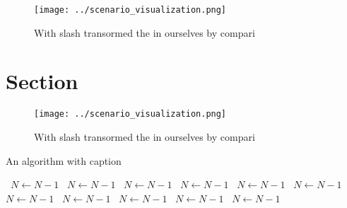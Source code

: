 \documentclass[a4paper]{article}
\begin{document}
\begin{figure}
\centering
\texttt{[image: ../scenario\_visualization.png]}
\caption{With slash transormed the in ourselves by compari
}
\end{figure}
 
\section{Section}

\begin{figure}
\centering
\texttt{[image: ../scenario\_visualization.png]}
\caption{With slash transormed the in ourselves by compari
}
\end{figure}
 
\begin{algorithm}
\caption{An algorithm with caption}
\begin{algorithmic}
\    \State $N \gets N - 1$
\    \State $N \gets N - 1$
\    \State $N \gets N - 1$
\    \State $N \gets N - 1$
\    \State $N \gets N - 1$
\    \State $N \gets N - 1$
\    \State $N \gets N - 1$
\    \State $N \gets N - 1$
\    \State $N \gets N - 1$
\    \State $N \gets N - 1$
\    \State $N \gets N - 1$
\EndWhile
\end{algorithmic}
\end{algorithm}
\end{document}
